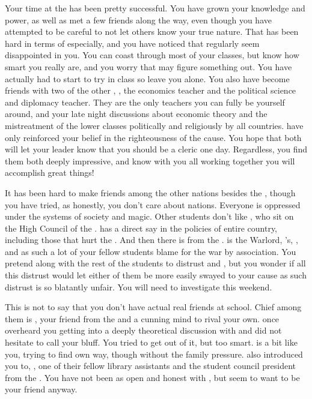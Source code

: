 \documentclass[char]{GL2020}
\begin{document}
Your time at the \pSchool{} has been pretty successful. You have grown your knowledge and power, as well as met a few friends along the way, even though you have attempted to be careful to not let others know your true nature. That has been hard in terms of \cHistory{} especially, and you have noticed that \cHistory{\they} regularly seem\cHistory{\verbs} disappointed in you. You can coast through most of your classes, but \cHistory{\they} know\cHistory{\verbs} how smart you really are, and you worry that \cHistory{\they} may figure something out. You have actually had to start to try in \cHistory{\their} class so \cHistory{\they} leave\cHistory{\verbs} you alone. You also have become friends with two of the other \pGoaties{}, \cChupSecond{\full}, the economics teacher and \cChupInventor{\full} the political science and diplomacy teacher. They are the only teachers you can fully be yourself around, and your late night discussions about economic theory and the mistreatment of the lower classes politically and religiously by all countries. have only reinforced your belief in the righteousness of the cause. You hope that both  will let your leader know that you should be a cleric one day. Regardless, you find them both deeply impressive, and know with you all working together you will accomplish great things!

 It has been hard to make friends among the other nations besides the \pFarm{}, though you have tried, as honestly, you don’t care about nations.  Everyone is oppressed under the systems of society and magic. Other students don’t like  \cTechStar{}, who sit\cTechStar{\verbs} on the High Council of the \pTech{}. \cTechStar{} has a direct say in the policies of \cTechStar{\their} entire country, including those that hurt the \pFarm{}. And then there is \cWarlordDaughter{\full} from the \pShip{}. \cWarlordDaughter{} is the \pShippie{} Warlord, \cLoud{\full}'s, \cWarlordDaughter{\offspring}, and as such a lot of your fellow students blame \cWarlordDaughter{\them} for the war by association. You pretend along with the rest of the \pFarm{} students to distrust \cTechStar{} and  \cWarlordDaughter{}, but you wonder if all this distrust would let either of them  be more easily swayed to your cause as such distrust is so blatantly unfair. You will need to investigate this weekend.

This is not to say that you don’t have actual real friends at school. Chief among them is \cAmbition{\full}, your friend from the \pTech{} and a cunning mind to rival your own. \cAmbition{} once overheard you getting into a deeply theoretical discussion with \cChupSecond{} and did not hesitate to call your bluff. You tried to get out of it, but \cAmbition{\theywere} too smart.  \cAmbition{} is a bit like you, trying to find \cAmbition{\their} own way, though without the family pressure.  \cAmbition{} also introduced you to, \cPresident{\full}, one of their fellow library assistants and the student council president from the \pShip{}. You have not been as open and honest with \cPresident{}, but \cPresident{\they} seem\cPresident{\verbs} to want to be your friend anyway.  
\end{document}
